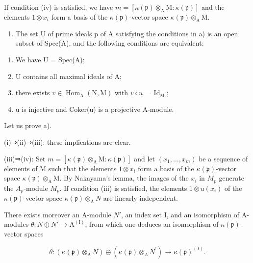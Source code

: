 If condition (iv) is satisfied, we have \(m = [\kappa(\mathfrak{p}) \otimes_{\mathrm{A}} \mathrm{M} : \kappa(\mathfrak{p})]\) and the elements \(1 \otimes x_i\) form a basis of the \(\kappa(\mathfrak{p})\)-vector space \(\kappa(\mathfrak{p}) \otimes_{\mathrm{A}} \mathrm{M}\).

\begin{enumerate}
\def\labelenumi{\alph{enumi})}
\setcounter{enumi}{1}
\tightlist
\item
  The set U of prime ideals p of A satisfying the conditions in a) is an open subset of Spec(A), and the following conditions are equivalent:
\end{enumerate}

\begin{enumerate}
\def\labelenumi{(\roman{enumi})}
\item
  We have U = Spec(A);
\item
  U contains all maximal ideals of A;
\item
  there exists \(v \in \operatorname{Hom}_{\mathrm{A}}(\mathrm{N}, \mathrm{M})\) with \(v \circ u = \operatorname{Id}_{\mathrm{M}}\);
\item
  u is injective and Coker(u) is a projective A-module.
\end{enumerate}

Let us prove a).

(i)⇒(ii)⇒(iii): these implications are clear.

(iii)⇒(iv): Set \(m = [\kappa(\mathfrak{p}) \otimes_{\mathrm{A}} \mathrm{M} : \kappa(\mathfrak{p})]\) and let \((x_{1}, \ldots, x_{m})\) be a sequence of elements of M such that the elements \(1 \otimes x_{i}\) form a basis of the \(\kappa(\mathfrak{p})\)-vector space \(\kappa(\mathfrak{p}) \otimes_{\mathrm{A}} \mathrm{M}\). By Nakayama's lemma, the images of the \(x_{i}\) in \(M_{p}\) generate the \(A_{p}\)-module \(M_{p}\). If condition (iii) is satisfied, the elements \(1 \otimes u(x_{i})\) of the \(\kappa(\mathfrak{p})\)-vector space \(\kappa(\mathfrak{p}) \otimes_{\mathrm{A}} N\) are linearly independent.

There exists moreover an A-module \(N'\), an index set I, and an isomorphism of A-modules \(\theta : N \oplus N' \to \mathrm{A}^{(\mathrm{I})}\), from which one deduces an isomorphism of \(\kappa(\mathfrak{p})\)-vector spaces

\[
\overline {{{\theta}}}: (\kappa (\mathfrak {p}) \otimes_ {\mathrm{A}} N) \oplus (\kappa (\mathfrak {p}) \otimes_ {A} N ^ {\prime}) \rightarrow \kappa (\mathfrak {p}) ^ {(I)}.
\]

